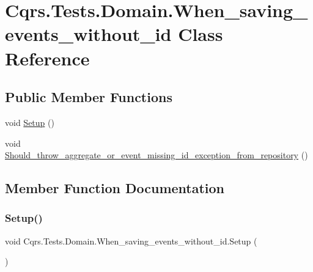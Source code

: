 \hypertarget{classCqrs_1_1Tests_1_1Domain_1_1When__saving__events__without__id}{}\section{Cqrs.\+Tests.\+Domain.\+When\+\_\+saving\+\_\+events\+\_\+without\+\_\+id Class Reference}
\label{classCqrs_1_1Tests_1_1Domain_1_1When__saving__events__without__id}
\subsection*{Public Member Functions}
\begin{DoxyCompactItemize}
\item 
void \hyperlink{classCqrs_1_1Tests_1_1Domain_1_1When__saving__events__without__id_a3379aa02c949bd22246c0ba76ef2bfe4}{Setup} ()
\item 
void \hyperlink{classCqrs_1_1Tests_1_1Domain_1_1When__saving__events__without__id_a1886f7abc2500eab3e293f1cdcc5b0b4}{Should\+\_\+throw\+\_\+aggregate\+\_\+or\+\_\+event\+\_\+missing\+\_\+id\+\_\+exception\+\_\+from\+\_\+repository} ()
\end{DoxyCompactItemize}


\subsection{Member Function Documentation}
\mbox{\label{classCqrs_1_1Tests_1_1Domain_1_1When__saving__events__without__id_a3379aa02c949bd22246c0ba76ef2bfe4}} 
\subsubsection{\texorpdfstring{Setup()}{Setup()}}
{\footnotesize\ttfamily void Cqrs.\+Tests.\+Domain.\+When\+\_\+saving\+\_\+events\+\_\+without\+\_\+id.\+Setup (\begin{DoxyParamCaption}{ }\end{DoxyParamCaption})}

